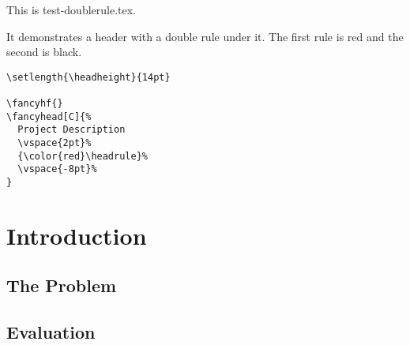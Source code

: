 \documentclass[openany]{book}
\begin{document}
\tableofcontents

\bigskip

\noindent
\begin{boxedminipage}{\textwidth}
  This is test-doublerule.tex.

  It demonstrates a header with a double rule under it. The first rule
  is red and the second is black.

\begin{verbatim}
\setlength{\headheight}{14pt}

\fancyhf{}
\fancyhead[C]{%
  Project Description
  \vspace{2pt}%
  {\color{red}\headrule}%
  \vspace{-8pt}%
}
\end{verbatim}
\end{boxedminipage}

\chapter{Introduction}
\lipsum[1]

\section{The Problem}
\label{sec:problem}

\lipsum[2-3]

\section{Evaluation}

\lipsum[3-5]
\end{document}
